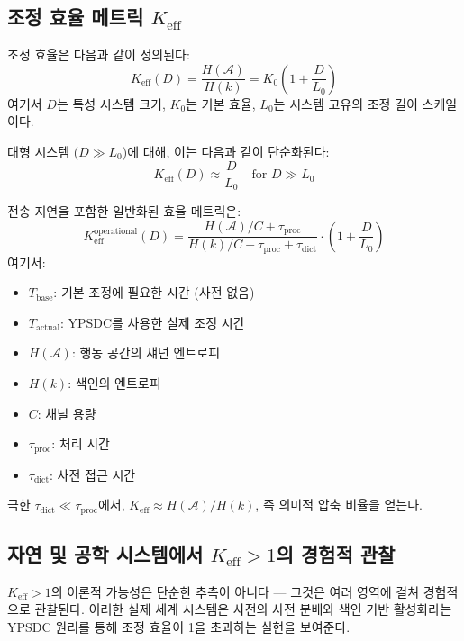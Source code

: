 \documentclass[11pt,a4paper]{article}
\begin{document}
	\subsection{조정 효율 메트릭 \texorpdfstring{$K_{\mathrm{eff}}$}{K_eff}}
	조정 효율은 다음과 같이 정의된다:
	\begin{equation}
		K_{\mathrm{eff}}(D) = \frac{H(\mathcal{A})}{H(k)} = K_0 \left(1 + \frac{D}{L_0}\right)
	\end{equation}
	여기서 $D$는 특성 시스템 크기, $K_0$는 기본 효율, $L_0$는 시스템 고유의 조정 길이 스케일이다.
	
	대형 시스템 ($D \gg L_0$)에 대해, 이는 다음과 같이 단순화된다:
	\begin{equation}
		K_{\mathrm{eff}}(D) \approx \frac{D}{L_0} \quad \text{for } D \gg L_0
	\end{equation}
	
	전송 지연을 포함한 일반화된 효율 메트릭은:
	\begin{equation}
		K_{\mathrm{eff}}^{\text{operational}}(D) = \frac{H(\mathcal{A})/C + \tau_{\text{proc}}}{H(k)/C + \tau_{\text{proc}} + \tau_{\text{dict}}} \cdot \left(1 + \frac{D}{L_0}\right)
	\end{equation}
	여기서:
	\begin{itemize}
		\item $T_{\text{base}}$: 기본 조정에 필요한 시간 (사전 없음)
		\item $T_{\text{actual}}$: YPSDC를 사용한 실제 조정 시간
		\item $H(\mathcal{A})$: 행동 공간의 섀넌 엔트로피
		\item $H(k)$: 색인의 엔트로피
		\item $C$: 채널 용량
		\item $\tau_{\text{proc}}$: 처리 시간
		\item $\tau_{\text{dict}}$: 사전 접근 시간
	\end{itemize}
	
	극한 $\tau_{\text{dict}} \ll \tau_{\text{proc}}$에서, $K_{\mathrm{eff}} \approx H(\mathcal{A})/H(k)$, 즉 의미적 압축 비율을 얻는다.
	
	\subsection{자연 및 공학 시스템에서 $K_{\mathrm{eff}} > 1$의 경험적 관찰}
	\label{sec:empirical-keff}
	
	$K_{\mathrm{eff}} > 1$의 이론적 가능성은 단순한 추측이 아니다 — 그것은 여러 영역에 걸쳐 경험적으로 관찰된다. 이러한 실제 세계 시스템은 사전의 사전 분배와 색인 기반 활성화라는 YPSDC 원리를 통해 조정 효율이 1을 초과하는 실현을 보여준다.
	
\end{document}
